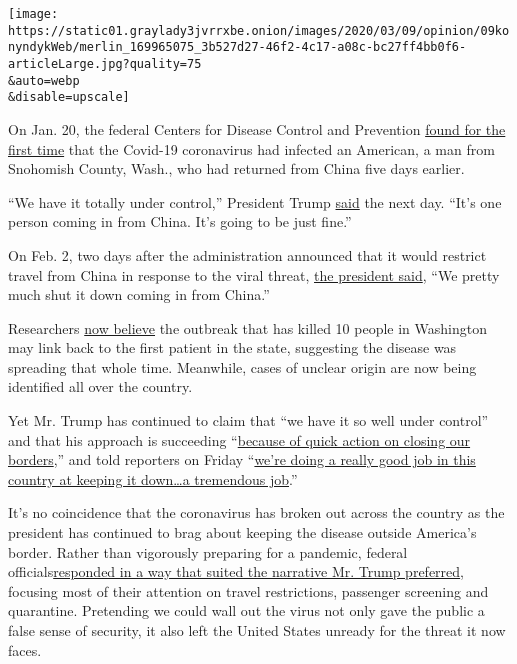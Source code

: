 \texttt{[image: https://static01.graylady3jvrrxbe.onion/images/2020/03/09/opinion/09konyndykWeb/merlin\_169965075\_3b527d27-46f2-4c17-a08c-bc27ff4bb0f6-articleLarge.jpg?quality=75\\\&auto=webp\\\&disable=upscale]}

On Jan. 20, the federal Centers for Disease Control and Prevention
\href{https://www.nytimes3xbfgragh.onion/2020/01/21/health/cdc-coronavirus.html}{found
for the first time} that the Covid-19 coronavirus had infected an
American, a man from Snohomish County, Wash., who had returned from
China five days earlier.

``We have it totally under control,'' President Trump
\href{https://www.politico.com/news/2020/01/22/trump-chinese-coronavirus-totally-under-control-102054}{said}
the next day. ``It's one person coming in from China. It's going to be
just fine.''

On Feb. 2, two days after the administration announced that it would
restrict travel from China in response to the viral threat,
\href{https://www.nytimes3xbfgragh.onion/2020/02/02/us/politics/trump-super-bowl-interview-coronavirus.html}{the
president said}, ``We pretty much shut it down coming in from China.''

Researchers
\href{https://www.nytimes3xbfgragh.onion/2020/03/01/health/coronavirus-washington-spread.html}{now
believe} the outbreak that has killed 10 people in Washington may link
back to the first patient in the state, suggesting the disease was
spreading that whole time. Meanwhile, cases of unclear origin are now
being identified all over the country.

Yet Mr. Trump has continued to claim that ``we have it so well under
control'' and that his approach is succeeding
``\href{https://twitter.com/realDonaldTrump/status/1235604572850343937}{because
of quick action on closing our borders},'' and told reporters on Friday
``\href{https://www.whitehouse.gov/briefings-statements/remarks-president-trump-tour-centers-disease-control-prevention-atlanta-ga/}{we're
doing a really good job in this country at keeping it down\ldots{}a
tremendous job}.''

It's no coincidence that the coronavirus has broken out across the
country as the president has continued to brag about keeping the disease
outside America's border. Rather than vigorously preparing for a
pandemic, federal
officials\href{https://www.nytimes3xbfgragh.onion/2020/03/07/us/politics/trump-coronavirus.html?action=click\&module=Top\%20Stories\&pgtype=Homepage}{responded
in a way that suited the narrative Mr. Trump preferred}, focusing most
of their attention on travel restrictions, passenger screening and
quarantine. Pretending we could wall out the virus not only gave the
public a false sense of security, it also left the United States unready
for the threat it now faces.

